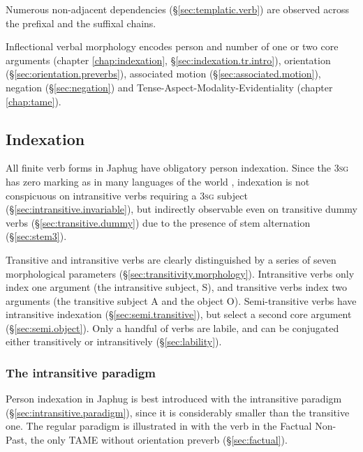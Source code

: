  Numerous non-adjacent dependencies (§\ref{sec:templatic.verb}) are observed across the prefixal and the suffixal chains.
 
Inflectional verbal morphology encodes person and number of one or two core arguments (chapter \ref{chap:indexation}, §\ref{sec:indexation.tr.intro}), orientation (§\ref{sec:orientation.preverbs}), associated motion (§\ref{sec:associated.motion}), negation (§\ref{sec:negation}) and Tense-Aspect-Modality-Evidentiality (chapter \ref{chap:tame}). 
 
 
\subsection{Indexation} \label{sec:indexation.intro}
All finite verb forms in Japhug have obligatory person indexation. Since the \textsc{3sg} has zero marking as in many languages of the world \citep[227--236]{benveniste66problemes1}, indexation is not conspicuous on intransitive verbs requiring a \textsc{3sg} subject (§\ref{sec:intransitive.invariable}), but indirectly observable even on transitive dummy verbs (§\ref{sec:transitive.dummy}) due to the presence of stem alternation (§\ref{sec:stem3}).

Transitive and intransitive verbs are clearly distinguished by a series of seven morphological parameters (§\ref{sec:transitivity.morphology}). Intransitive verbs only index one argument (the intransitive subject, S), and transitive verbs index two arguments (the transitive subject A and the object O). Semi-transitive verbs have intransitive indexation (§\ref{sec:semi.transitive}), but select a second core argument (§\ref{sec:semi.object}). Only a handful of verbs are labile, and can be conjugated either transitively or intransitively (§\ref{sec:lability}).

\subsubsection{The intransitive paradigm}
Person indexation in Japhug is best introduced with the intransitive paradigm (§\ref{sec:intransitive.paradigm}), since it is considerably smaller than the transitive one. The regular paradigm is illustrated in  with the verb  in the Factual Non-Past, the only TAME without orientation preverb (§\ref{sec:factual}).
 
